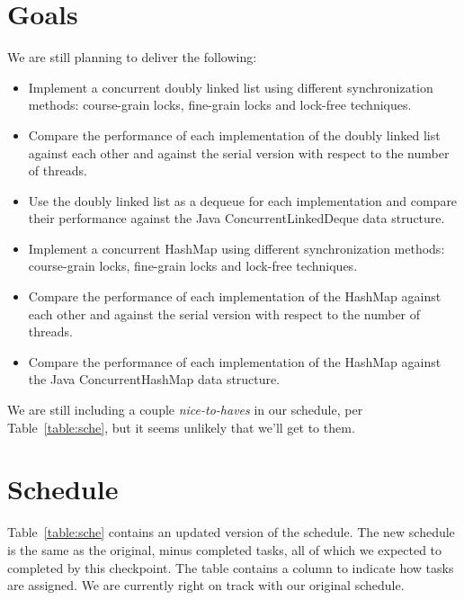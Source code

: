 \documentclass[11pt]{article}
\begin{document}
\section*{Goals}
We are still planning to deliver the following:
\begin{itemize}
\item
Implement a concurrent doubly linked list using different
synchronization methods: course-grain locks, fine-grain locks and lock-free
techniques.
\item Compare the performance of each implementation of the doubly
linked list against each other and against the serial version with respect to
the number of threads.
\item Use the doubly linked list as a dequeue for each implementation and compare
their performance against the Java ConcurrentLinkedDeque data structure.
\item Implement a concurrent HashMap using different synchronization methods:
course-grain locks, fine-grain locks and lock-free techniques.
\item Compare the performance of each implementation of the HashMap against
each other and against the serial version with respect to the number of threads.
\item Compare the performance of each implementation of the HashMap against
the Java ConcurrentHashMap data structure.
\end{itemize}

We are still including a couple {\it nice-to-haves} in our schedule, per
Table~\ref{table:sche}, but it seems unlikely that we'll get to them.

\section*{Schedule}
Table~\ref{table:sche} contains an updated version of the schedule. The new
schedule is the same as the original, minus completed tasks, all of which we
expected to completed by this checkpoint. The table contains a column to
indicate how tasks are assigned. We are currently right on track with our
original schedule.
\end{document}
